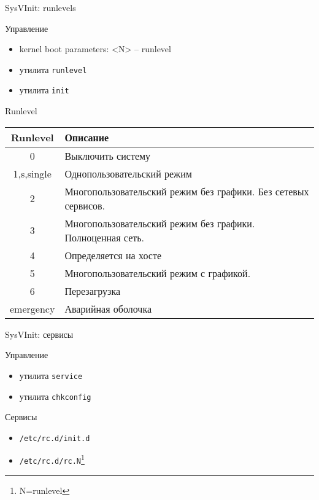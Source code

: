 \begin{frame}{SysVInit: runlevels}
	\begin{block}{Управление}
		\begin{itemize}
			\item kernel boot parameters: <N> -- runlevel
			\item утилита {\tt runlevel}
			\item утилита {\tt init}
		\end{itemize}
	\end{block}

	\scriptsize
	\begin{block}{Runlevel}
		\begin{table}
			\begin{tabular}{| c | l | }
			\hline
			Runlevel & Описание\\
			\hline
			0	& Выключить систему \\
			1,s,single & Однопользовательский режим \\
			2	& Многопользовательский режим без графики. Без сетевых сервисов.\\
			3	& Многопользовательский режим без графики. Полноценная сеть. \\
			4	& Определяется на хосте\\
			5	& Многопользовательский режим с графикой.\\
			6	& Перезагрузка\\
			emergency & Аварийная оболочка \\
			\hline
			\end{tabular}
		\end{table}
	\end{block}
\end{frame}

\begin{frame}{SysVInit: сервисы}
	\begin{block}{Управление}
		\begin{itemize}
			\item утилита {\tt service}
			\item утилита {\tt chkconfig}
		\end{itemize}
	\end{block}

	\begin{block}{Сервисы}
		\begin{itemize}
			\item {\tt /etc/rc.d/init.d}
			\item {\tt /etc/rc.d/rc.N}\footnote{N=runlevel}
		\end{itemize}
	\end{block}
\end{frame}

